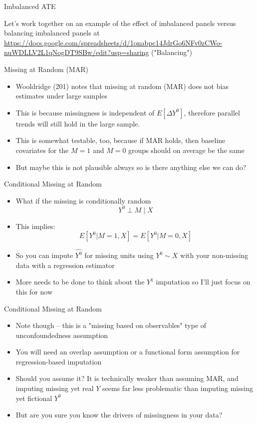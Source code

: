 \documentclass{beamer}
\begin{document}
\begin{frame}{Imbalanced ATE}

Let's work together on an example of the effect of imbalanced panels versus balancing imbalanced panels at \url{https://docs.google.com/spreadsheets/d/1onabpc14JdrGo6NFv0zCWo-nuWDLLV2L1qNogDT9SBw/edit?usp=sharing} ("Balancing")

\end{frame}

\begin{frame}{Missing at Random (MAR)}
  \begin{itemize}
    \item Wooldridge (201) notes that missing at random (MAR) does not bias estimates under large samples
    \item This is because missingness is independent of $E[\Delta Y^0]$, therefore parallel trends will still hold in the large sample.
    \item This is somewhat testable, too, because if MAR holds, then baseline covariates for the $M=1$ and $M=0$ groups should on average be the same 
    \item But maybe this is not plausible always so is there anything else we can do?
  \end{itemize}
\end{frame}


\begin{frame}{Conditional Missing at Random}
  \begin{itemize}
	\item What if the missing is conditionally random $$Y^0  \perp M \mid X$$
    \item This implies:
    $$E[Y^0|M=1,X] = E[Y^0|M=0,X]$$
	\item So you can impute $\widehat{Y^0}$ for missing units using $Y^0 \sim X$ with your non-missing data with a regression estimator
	\item More needs to be done to think about the $Y^1$ imputation so I'll just focus on this for now
  \end{itemize}
\end{frame}

\begin{frame}{Conditional Missing at Random}

\begin{itemize}
    \item Note though -- this is a "missing based on observables" type of unconfoundedness assumption
    \item You will need an overlap assumption or a functional form assumption for regression-based imputation
    \item Should you assume it?  It is technically weaker than assuming MAR, and imputing missing yet real $Y$ seems far less problematic than imputing missing yet fictional $Y^0$
    \item But are you sure you know the drivers of missingness in your data?

\end{itemize}

\end{frame}
\end{document}
